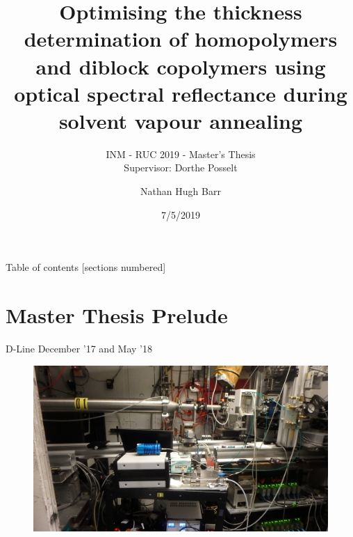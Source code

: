 \documentclass[10pt]{beamer}
\title{Optimising the thickness determination of homopolymers and diblock copolymers using optical spectral reflectance during solvent vapour annealing}
\subtitle{INM - RUC 2019 - Master's Thesis \\ Supervisor: Dorthe Posselt}
\date{7/5/2019}
\author{Nathan Hugh Barr}
\institute{Roskilde University}
\begin{document}
\maketitle

\begin{frame}{Table of contents}
  [sections numbered]
  \tableofcontents[hideallsubsections]
\end{frame}

	\section{Master Thesis Prelude}


\begin{frame}{D-Line}
December '17 and May '18
	\begin{figure}
		\includegraphics[scale=0.15]{chess3.JPG}
	\end{figure}
\end{frame}
\end{document}
